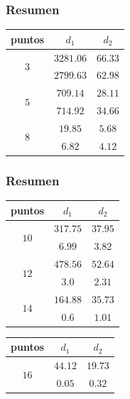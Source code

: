 \documentclass[12pt]{beamer}
\begin{document}
\begin{frame}
\frametitle{Resumen}
\begin{table}
    \fontsize{12}{12}\selectfont
\begin{tabular}{| c | c | c |} \hline
puntos & $d_{1}$ & $d_{2}$ \\\hline
\multirow{2}{*}{$3$} & $3281.06$ & $66.33$ \\
 & $2799.63$ & $62.98$ \\ \hline
 \multirow{2}{*}{$5$} & $709.14$ & $28.11$ \\
 & $714.92$ & $34.66$ \\ \hline 
 \multirow{2}{*}{$8$} & $19.85$ & $5.68$ \\
 & $6.82$ & $4.12$ \\ \hline
\end{tabular}
\end{table}
\end{frame}
\begin{frame}
\frametitle{Resumen}
\begin{minipage}[t]{0.4\textwidth}
\begin{table}
\renewcommand{\arraystretch}{0.99}
\fontsize{12}{12}\selectfont
\begin{tabular}{| c | c | c |} \hline
puntos & $d_{1}$ & $d_{2}$ \\\hline
\multirow{2}{*}{$10$} & $317.75$ & $37.95$ \\
    & $6.99$ & $3.82$ \\ \hline
    \multirow{2}{*}{$12$} & $478.56$ & $52.64$ \\
    & $3.0$ & $2.31$ \\ \hline 
    \multirow{2}{*}{$14$} & $164.88$ & $35.73$ \\
    & $0.6$ & $1.01$ \\ \hline
\end{tabular}
\end{table}
\end{minipage}
\hspace{0.6cm}
\begin{minipage}[t]{0.4\textwidth}
\begin{table}
\fontsize{12}{12}\selectfont
\begin{tabular}{| c | c | c |} \hline
puntos & $d_{1}$ & $d_{2}$ \\\hline
\multirow{2}{*}{$16$} & $44.12$ & $19.73$ \\
    & $0.05$ & $0.32$ \\ \hline
\end{tabular}
\end{table}
\end{minipage}
\end{frame}
\end{document}

